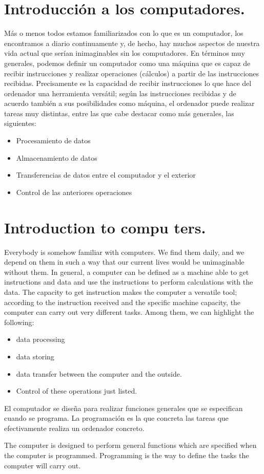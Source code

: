 \begin{paracol}{2}
\section[Introducción a los computadores.]{Introducción a los com\-putadores.}
Más o menos todos estamos familiarizados con lo que es un computador, los encontramos a diario continuamente  y, de hecho, hay muchos aspectos de nuestra vida actual que serían inimaginables sin los computadores.  En términos muy generales, podemos definir un computador como una máquina que es capaz de recibir instrucciones y realizar operaciones (cálculos) a partir de las instrucciones recibidas. Precisamente es la capacidad de recibir instrucciones lo que hace del ordenador una herramienta versátil; según las instrucciones recibidas y de acuerdo también a sus posibilidades como máquina,  el ordenador puede realizar tareas muy distintas, entre las que cabe destacar como más generales, las siguientes:
\begin{itemize}
\item Procesamiento de datos 
\item Almacenamiento de datos
\item Transferencias de datos entre el computador y el exterior
\item Control de las anteriores operaciones
\end{itemize}

\switchcolumn
\section{Introduction to compu\- ters.}
Everybody is somehow familiar with computers. We find them daily, and we depend on them in such a way that our current lives would be unimaginable without them. In general, a computer can be defined as a machine able to get instructions and data and use the instructions to perform calculations with the data. The capacity to get instruction makes the computer a versatile tool; according to the instruction received and the specific machine capacity, the computer can carry out very different tasks. Among them, we can highlight the following:
\begin{itemize}
\item data processing
\item data storing
\item data transfer between the computer and the outside.
\item Control of these operations just listed.
\end{itemize}    

\switchcolumn
El computador se diseña para realizar funciones generales que se especifican cuando se programa. La programación es la que concreta las tareas que efectivamente realiza un ordenador concreto.

\switchcolumn
The computer is designed to perform general functions which are specified when the computer is programmed. Programming is the way to define the tasks the computer will carry out. 

\end{paracol}
